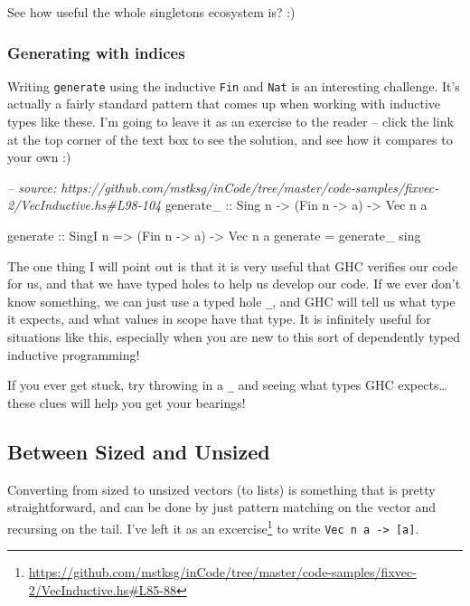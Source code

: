 \documentclass[]{article}
\newenvironment{Shaded}{}{}
\newcommand{\DataTypeTok}[1]{\textcolor[rgb]{0.56,0.13,0.00}{#1}}
\newcommand{\CommentTok}[1]{\textcolor[rgb]{0.38,0.63,0.69}{\textit{#1}}}
\newcommand{\OtherTok}[1]{\textcolor[rgb]{0.00,0.44,0.13}{#1}}
\newcommand{\FunctionTok}[1]{\textcolor[rgb]{0.02,0.16,0.49}{#1}}
\newcommand{\NormalTok}[1]{#1}
\renewcommand{\href}[2]{#2\footnote{\url{#1}}}
\begin{document}
See how useful the whole singletons ecosystem is? :)

\subsubsection{Generating with indices}\label{generating-with-indices-1}

Writing \texttt{generate} using the inductive \texttt{Fin} and \texttt{Nat} is
an interesting challenge. It's actually a fairly standard pattern that comes up
when working with inductive types like these. I'm going to leave it as an
exercise to the reader -- click the link at the top corner of the text box to
see the solution, and see how it compares to your own :)

\begin{Shaded}
\begin{Highlighting}[]
\CommentTok{-- source: https://github.com/mstksg/inCode/tree/master/code-samples/fixvec-2/VecInductive.hs#L98-104}
\OtherTok{generate_ ::} \DataTypeTok{Sing}\NormalTok{ n }\OtherTok{->}\NormalTok{ (}\DataTypeTok{Fin}\NormalTok{ n }\OtherTok{->}\NormalTok{ a) }\OtherTok{->} \DataTypeTok{Vec}\NormalTok{ n a}

\OtherTok{generate ::} \DataTypeTok{SingI}\NormalTok{ n }\OtherTok{=>}\NormalTok{ (}\DataTypeTok{Fin}\NormalTok{ n }\OtherTok{->}\NormalTok{ a) }\OtherTok{->} \DataTypeTok{Vec}\NormalTok{ n a}
\NormalTok{generate }\FunctionTok{=}\NormalTok{ generate_ sing}
\end{Highlighting}
\end{Shaded}

The one thing I will point out is that it is very useful that GHC verifies our
code for us, and that we have typed holes to help us develop our code. If we
ever don't know something, we can just use a typed hole \texttt{\_}, and GHC
will tell us what type it expects, and what values in scope have that type. It
is infinitely useful for situations like this, especially when you are new to
this sort of dependently typed inductive programming!

If you ever get stuck, try throwing in a \texttt{\_} and seeing what types GHC
expects\ldots{}these clues will help you get your bearings!

\subsection{Between Sized and Unsized}\label{between-sized-and-unsized}

Converting from sized to unsized vectors (to lists) is something that is pretty
straightforward, and can be done by just pattern matching on the vector and
recursing on the tail. I've
\href{https://github.com/mstksg/inCode/tree/master/code-samples/fixvec-2/VecInductive.hs\#L85-88}{left
it as an excercise} to write \texttt{Vec\ n\ a\ -\textgreater{}\ {[}a{]}}.
\end{document}
